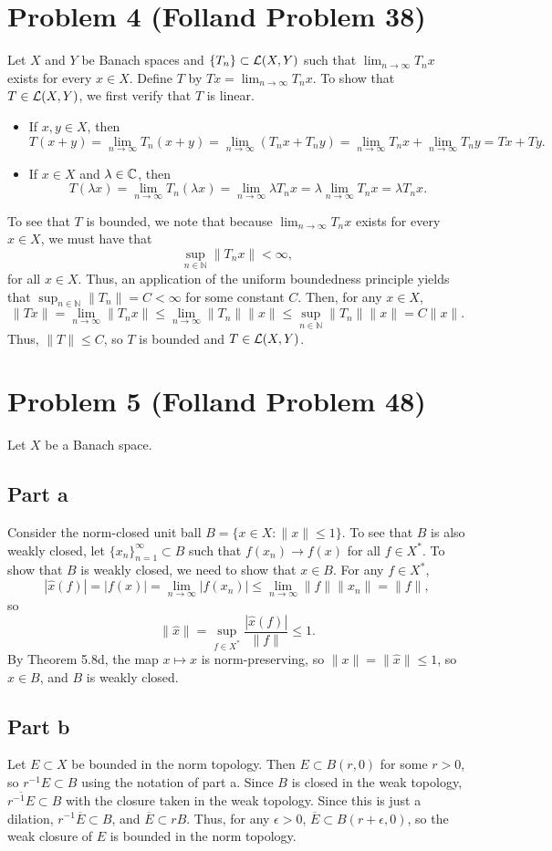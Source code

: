 \documentclass{article}
\begin{document}
\section{Problem 4 (Folland Problem 38)}
Let $X$ and $Y$ be Banach spaces and $\{T_n\}\subset{\cal L}(X,Y)$ such that $\lim_{n\to\infty} T_nx$ exists for every $x\in X$. Define $T$ by $Tx=\lim_{n\to\infty} T_nx$. To show that $T\in{\cal L}(X,Y)$, we first verify that $T$ is linear.
\begin{itemize}
	\item If $x,y\in X$, then
	\[
	T(x+y)=\lim_{n\to\infty} T_n(x+y)=\lim_{n\to\infty} (T_nx+T_ny)=\lim_{n\to\infty} T_nx+\lim_{n\to\infty} T_ny=Tx+Ty.
	\]
	\item If $x\in X$ and $\lambda\in\mathbb{C}$, then
	\[
	T(\lambda x)=\lim_{n\to\infty} T_n(\lambda x)=\lim_{n\to\infty} \lambda T_nx=\lambda\lim_{n\to\infty} T_nx=\lambda T_nx.
	\]
\end{itemize}
To see that $T$ is bounded, we note that because $\lim_{n\to\infty} T_nx$ exists for every $x\in X$, we must have that
\[
\sup_{n\in\mathbb{N}}\|T_nx\|<\infty,
\]
for all $x\in X$. Thus, an application of the uniform boundedness principle yields that $\sup_{n\in\mathbb{N}}\|T_n\|=C<\infty$ for some constant $C$. Then, for any $x\in X$, 
\[
\|Tx\|=\lim_{n\to\infty}\|T_nx\|\leq\lim_{n\to\infty}\|T_n\|\|x\|\leq\sup_{n\in\mathbb{N}}\|T_n\|\|x\|=C\|x\|.
\]
Thus, $\|T\|\leq C$, so $T$ is bounded and $T\in{\cal L}(X,Y)$.

\section{Problem 5 (Folland Problem 48)}
Let $X$ be a Banach space.
\subsection{Part a}
Consider the norm-closed unit ball $B=\{x\in X:\|x\|\leq1\}$. To see that $B$ is also weakly closed, let $\{x_n\}_{n=1}^\infty\subset B$ such that $f(x_n)\to f(x)$ for all $f\in X^*$. To show that $B$ is weakly closed, we need to show that $x\in B$. For any $f\in X^*$,
\[
|\hat x(f)|=|f(x)|=\lim_{n\to\infty}|f(x_n)|\leq\lim_{n\to\infty}\|f\|\|x_n\|=\|f\|,
\]
so 
\[
\|\hat x\|=\sup_{f\in X^*}\frac{|\hat x(f)|}{\|f\|}\leq 1.
\]
By Theorem 5.8d, the map $x\mapsto\hat x$ is norm-preserving, so $\|x\|=\|\hat x\|\leq1$, so $x\in B$, and $B$ is weakly closed.

\subsection{Part b}
Let $E\subset X$ be bounded in the norm topology. Then $E\subset B(r,0)$ for some $r>0$, so $r^{-1}E\subset B$ using the notation of part a. Since $B$ is closed in the weak topology, $\overline{r^{-1}E}\subset B$ with the closure taken in the weak topology. Since this is just a dilation, $r^{-1}\overline E\subset B$, and $\overline{E}\subset rB$. Thus, for any $\epsilon>0$, $\overline{E}\subset B(r+\epsilon,0)$, so the weak closure of $E$ is bounded in the norm topology.
\end{document}
